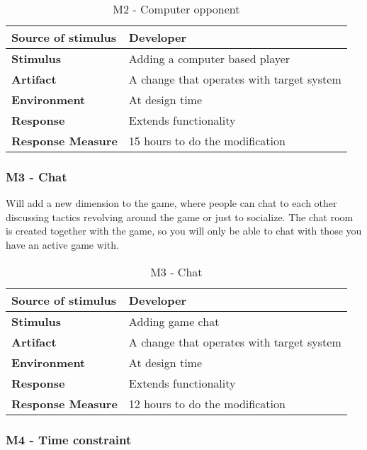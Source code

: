 \begin{table}[h!]
\begin{tabular}{ | p{110pt} | p{250pt}  |}
\hline
\bf Source of stimulus &  Developer  \\ \hline
\bf Stimulus & Adding a computer based player \\ \hline 
\bf Artifact & A change that operates with target system  \\  \hline
\bf Environment & At design time \\ \hline
\bf Response & Extends functionality \\ \hline
\bf Response Measure & 15 hours to do the modification \\ \hline

\end{tabular}
\caption{M2 - Computer opponent}
\end{table}

\subsubsection{M3 - Chat}

Will add a new dimension to the game, where people can chat to each other discussing tactics revolving around the game or just to socialize. The chat room is created together with the game, so you will only be able to chat with those you have an active game with.

\begin{table}[h!]
\begin{tabular}{ | p{110pt} | p{250pt}  |}
\hline
\bf Source of stimulus &  Developer  \\ \hline
\bf Stimulus & Adding game chat \\ \hline 
\bf Artifact & A change that operates with target system  \\  \hline
\bf Environment & At design time \\ \hline
\bf Response & Extends functionality \\ \hline
\bf Response Measure & 12 hours to do the modification \\ \hline

\end{tabular}
\caption{M3 - Chat}
\end{table}

\subsubsection{M4 - Time constraint}

